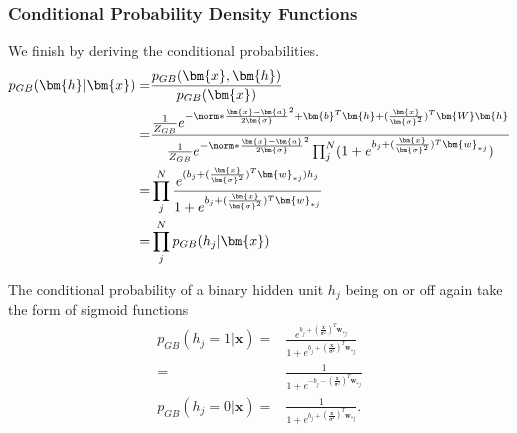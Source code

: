 \subsubsection{Conditional Probability Density Functions}

We finish by deriving the conditional probabilities. 
\begin{align}
	p_{GB} (\bm{h}| \bm{x}) =& \frac{p_{GB} (\bm{x}, \bm{h})}{p_{GB} (\bm{x})} \nonumber \\
	=& \frac{\frac{1}{Z_{GB}} e^{-\norm*{\frac{\bm{x} -\bm{a}}{2\bm{\sigma}}}^2 + \bm{b}^T \bm{h} 
	+ (\frac{\bm{x}}{\bm{\sigma}^2})^T \bm{W}\bm{h}}}
	{\frac{1}{Z_{GB}} e^{-\norm*{\frac{\bm{x} -\bm{a}}{2\bm{\sigma}}}^2}
	\prod_j^N (1 + e^{b_j + (\frac{\bm{x}}{\bm{\sigma}^2})^T \bm{w}_{\ast j}} ) }
	\nonumber \\
	=& \prod_j^N \frac{e^{(b_j + (\frac{\bm{x}}{\bm{\sigma}^2})^T \bm{w}_{\ast j})h_j } }
	{1 + e^{b_j + (\frac{\bm{x}}{\bm{\sigma}^2})^T \bm{w}_{\ast j}}} \nonumber \\
	=& \prod_j^N p_{GB} (h_j|\bm{x})
\end{align}

The conditional probability of a binary hidden unit $h_j$ being on or off again take the form of sigmoid functions
\begin{align}
	p_{GB} (h_j =1 | \bm{x}) =& \frac{e^{b_j + (\frac{\bm{x}}{\bm{\sigma}^2})^T \bm{w}_{\ast j} } }
	{1 + e^{b_j + (\frac{\bm{x}}{\bm{\sigma}^2})^T \bm{w}_{\ast j}}} \nonumber \\
	=& \frac{1}{1 + e^{-b_j - (\frac{\bm{x}}{\bm{\sigma}^2})^T \bm{w}_{\ast j}}} \\
	p_{GB} (h_j =0 | \bm{x}) =&
	\frac{1}{1 + e^{b_j +(\frac{\bm{x}}{\bm{\sigma}^2})^T \bm{w}_{\ast j}}} .
\end{align}

